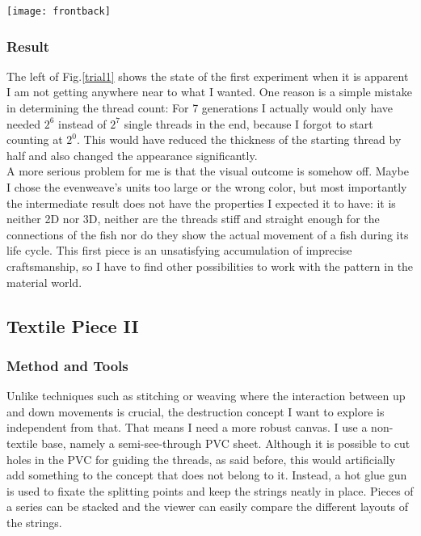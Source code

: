 \documentclass{scrartcl}
\begin{document}
\vspace{0.5cm}
\begin{minipage}[t]{\textwidth}
    \texttt{[image: frontback]}
	\label{trial1}
\end{minipage}
\vspace{0.5cm}

\subsubsection{Result}
The left of Fig.\ref{trial1} shows the state of the first experiment when it is apparent I am not getting anywhere near to what I wanted. One reason is a simple mistake in determining the thread count: For 7 generations I actually would only have needed $2^6$ instead of $2^7$ single threads in the end, because I forgot to start counting at $2^0$. This would have reduced the thickness of the starting thread by half and also changed the appearance significantly.\\
A more serious problem for me is that the visual outcome is somehow off. Maybe I chose the evenweave's units too large or the wrong color, but most importantly the intermediate result does not have the properties I expected it to have: it is neither 2D nor 3D, neither are the threads stiff and straight enough for the connections of the fish nor do they show the actual movement of a fish during its life cycle.
This first piece is an unsatisfying accumulation of imprecise craftsmanship, so I have to find other possibilities to work with the pattern in the material world.

\subsection{Textile Piece II}
\subsubsection{Method and Tools}
Unlike techniques such as stitching or weaving where the interaction between up and down movements is crucial, the destruction concept I want to explore is independent from that. That means I need a more robust canvas. I use a non-textile base, namely a semi-see-through PVC sheet. Although it is possible to cut holes in the PVC for guiding the threads, as said before, this would artificially add something to the concept that does not belong to it. Instead, a hot glue gun is used to fixate the splitting points and keep the strings neatly in place.
Pieces of a series can be stacked and the viewer can easily compare the different layouts of the strings.
\end{document}
